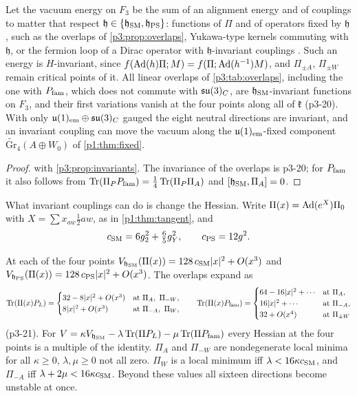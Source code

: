\begin{corollary}
\label{p3:cor:matter}
Let the vacuum energy on $F_3$ be the sum of an alignment energy and of couplings to matter that respect $\mathfrak h\in\{\mathfrak h_{\rm SM},\mathfrak h_{\rm PS}\}$: functions of $\Pi$
and of operators fixed by $\mathfrak h$, such as the overlaps of \cref{p3:prop:overlaps}, Yukawa-type kernels commuting with $\mathfrak h$, or the fermion loop of a Dirac operator
with $\mathfrak h$-invariant couplings \cite[Section~21]{ES17}. Such an energy is $H$-invariant, since $f(\operatorname{Ad}(h)\Pi;M)=f(\Pi;\operatorname{Ad}(h^{-1})M)$, and $\Pi_{\pm A}$, $\Pi_{\pm W}$ remain
critical points of it. All linear overlaps of \cref{p3:tab:overlaps}, including the one with $P_{\rm fam}$, which does not commute with $\mathfrak{su}(3)_C$, are $\mathfrak h_{\rm SM}$-invariant
functions on $F_3$, and their first variations vanish at the four points along all of $\mathfrak k$ (p3-20). With only $\mathfrak{u}(1)_{\rm em}\oplus\mathfrak{su}(3)_C$ gauged the eight neutral
directions are invariant, and an invariant coupling can move the vacuum along the $\mathfrak{u}(1)_{\rm em}$-fixed component $\widetilde{\mathrm{Gr}}_4(A\oplus W_0)$ of
\cref{p1:thm:fixed}.
\end{corollary}

\begin{proof}
 with \cref{p3:prop:invariants}. The invariance of the overlaps is p3-20; for $P_{\rm fam}$ it also follows from $\operatorname{Tr}(\Pi_PP_{\rm fam})=\tfrac14\operatorname{Tr}(\Pi_P\Pi_A)$ and
$[\mathfrak h_{\rm SM},\Pi_A]=0$.
\end{proof}

What invariant couplings can do is change the Hessian. Write $\Pi(x)=\operatorname{Ad}(e^X)\Pi_0$ with $X=\sum x_{aw}\tfrac12aw$, as in \cref{p1:thm:tangent}, and
\[
c_{\rm SM}=6g_2^2+\tfrac65g_Y^2,\qquad c_{\rm PS}=12g^2 .
\]

\begin{proposition}
\label{p3:prop:hessian}
At each of the four points $V_{\mathfrak h_{\rm SM}}(\Pi(x))=128\,c_{\rm SM}|x|^2+O(x^3)$ and $V_{\mathfrak h_{\rm PS}}(\Pi(x))=128\,c_{\rm PS}|x|^2+O(x^3)$. The overlaps expand as
\[
\Tr(\Pi(x)P_L)=\begin{cases}32-8|x|^2+O(x^3)&\text{at }\Pi_A,\ \Pi_{-W},\\ 8|x|^2+O(x^3)&\text{at }\Pi_{-A},\ \Pi_W,\end{cases}\qquad
\Tr(\Pi(x)\Pfam)=\begin{cases}64-16|x|^2+\cdots&\text{at }\Pi_A,\\ 16|x|^2+\cdots&\text{at }\Pi_{-A},\\ 32+O(x^4)&\text{at }\Pi_{\pm W}\end{cases}
\]
(p3-21). For $V=\kappa V_{\mathfrak h_{\rm SM}}-\lambda\operatorname{Tr}(\Pi P_L)-\mu\operatorname{Tr}(\Pi P_{\rm fam})$ every Hessian at the four points is a multiple of the identity. $\Pi_A$ and $\Pi_{-W}$ are
nondegenerate local minima for all $\kappa\ge0$, $\lambda,\mu\ge0$ not all zero. $\Pi_W$ is a local minimum iff $\lambda<16\kappa c_{\rm SM}$, and $\Pi_{-A}$ iff
$\lambda+2\mu<16\kappa c_{\rm SM}$. Beyond these values all sixteen directions become unstable at once.
\end{proposition}

